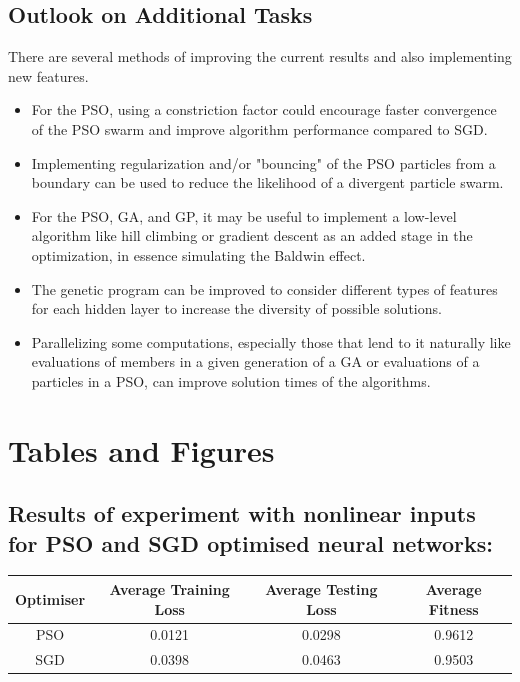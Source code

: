 \documentclass[12pt]{article}
\begin{document}
\subsection{Outlook on Additional Tasks}
There are several methods of improving the current results and also implementing new features.
\begin{itemize}
    \itemsep0em 
    \item For the PSO, using a constriction factor could encourage faster convergence of the PSO swarm and improve algorithm performance compared to SGD.
    \item Implementing regularization and/or "bouncing" of the PSO particles from a boundary can be used to reduce the likelihood of a divergent particle swarm.
    \item For the PSO, GA, and GP, it may be useful to implement a low-level algorithm like hill climbing or gradient descent as an added stage in the optimization, in essence simulating the Baldwin effect. 
    \item The genetic program can be improved to consider different types of features for each hidden layer to increase the diversity of possible solutions.
    \item Parallelizing some computations, especially those that lend to it naturally like evaluations of members in a given generation of a GA or evaluations of a particles in a PSO, can improve solution times of the algorithms.
\end{itemize}  
  

\pagebreak
\appendix
\section{Tables and Figures}
\subsection{Results of experiment with nonlinear inputs for PSO and SGD optimised neural networks:}
\begin{center}
 \begin{tabular}{||c c c c||} 
 \hline
 Optimiser & Average Training Loss & Average Testing Loss & Average Fitness \\ [0.5ex] 
 \hline\hline
 PSO & 0.0121 & 0.0298 & 0.9612 \\ 
 \hline
 SGD & 0.0398 & 0.0463 & 0.9503 \\
 \hline
\end{tabular}
\end{center}
\end{document}
